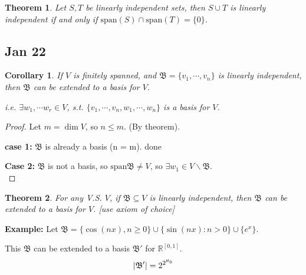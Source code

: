 \documentclass[12pt]{article}
\newtheorem{theorem}{Theorem}[subsection]
\newtheorem{corollary}{Corollary}[subsection]
\newcommand{\Span}{\mathrm{span}}
\newcommand{\abs}[1]{\left| #1 \right|}
\newcommand{\mR}{{\mathbb{R}}}
\begin{document}
	\begin{theorem}
		Let $S, T$ be linearly independent sets, then $S \cup T$ is linearly
		independent if and only if $\Span(S) \cap \Span(T) = \{0\}$. 
	\end{theorem}



	




	\newpage
	\subsection{Jan 22}
	\begin{corollary}
		If $V$ is finitely spanned, and $\mathfrak{B} = \{v_1, \cdots, v_n\}$
		is linearly independent, then $\mathfrak{B}$ can be extended to a basis
		for $V$. 

		i.e. $\exists w_1, \cdots w_r \in V$, s.t. $\{v_1, \cdots, v_n, 
		w_1, \cdots, w_n\}$ is a basis for $V$. 
	\end{corollary}
	\begin{proof}
		Let $m = \dim V$, so $n \leq m$. (By theorem).
		
		\textbf{case 1: } 
		$\mathfrak{B}$ is already a basis (n = m). done

		\textbf{Case 2:} 
		$\mathfrak{B}$ is not a basis, so $\Span \mathfrak{B} \neq V$, 
		so $\exists w_1 \in V\backslash \mathfrak{B}$. \\
	\end{proof}

	\begin{theorem}
		For any V.S. $V$, if $\mathfrak{B} \subseteq V$ is linearly 
		independent, then $\mathfrak{B}$ can be extended to a basis for $V$. 
		[use axiom of choice]\\
	\end{theorem}
	
	{\color{Brown}
		\textbf{Example:} 
		Let $\mathfrak{B} = \{\cos (nx), n\geq 0\}\cup\{\sin (nx): n >0\} 
		\cup \{e^x\}$.

		This $\mathfrak{B}$ can be extended to a basis $\mathfrak B'$ 
		for $\mR^{[0,1]}$. 
		\[
			\abs{\mathfrak{B}'} = 2^{2^{\aleph_0}}\\
		\]
	}
	
\end{document}

